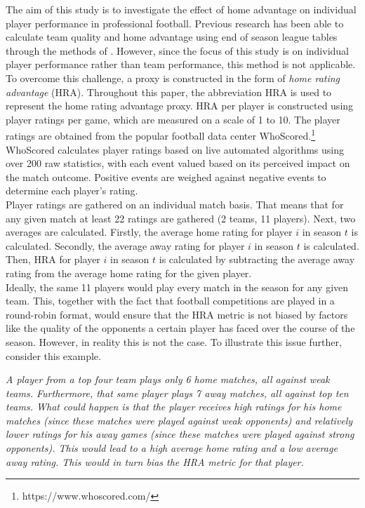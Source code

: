 The aim of this study is to investigate the effect of home advantage on individual player performance in professional football. Previous research has been able to calculate team quality and home advantage using end of season league tables through the methods of . However, since the focus of this study is on individual player performance rather than team performance, this method is not applicable. To overcome this challenge, a proxy is constructed in the form of \textit{home rating advantage} (HRA). Throughout this paper, the abbreviation HRA is used to represent the home rating advantage proxy. HRA per player is constructed using player ratings per game, which are measured on a scale of 1 to 10. The player ratings are obtained from the popular football data center WhoScored.\footnote{https://www.whoscored.com/} WhoScored calculates player ratings based on live automated algorithms using over 200 raw statistics, with each event valued based on its perceived impact on the match outcome. Positive events are weighed against negative events to determine each player's rating. \\

\noindent
Player ratings are gathered on an individual match basis. That means that for any given match at least 22 ratings are gathered (2 teams, 11 players). Next, two averages are calculated. Firstly, the average home rating for player $i$ in season $t$ is calculated. Secondly, the average away rating for player $i$ in season $t$ is calculated. Then, HRA for player $i$ in season $t$ is calculated by subtracting the average away rating from the average home rating for the given player. \\

\noindent
Ideally, the same 11 players would play every match in the season for any given team. This, together with the fact that football competitions are played in a round-robin format, would ensure that the HRA metric is not biased by factors like the quality of the opponents a certain player has faced over the course of the season. However, in reality this is not the case. To illustrate this issue further, consider this example. 
\begin{center}
    \textit{A player from a top four team plays only 6 home matches, all against weak teams. Furthermore, that same player plays 7 away matches, all against top ten teams. What could happen is that the player receives high ratings for his home matches (since these matches were played against weak opponents) and relatively lower ratings for his away games (since these matches were played against strong opponents). This would lead to a high average home rating and a low average away rating. This would in turn bias the HRA metric for that player.}
\end{center}

